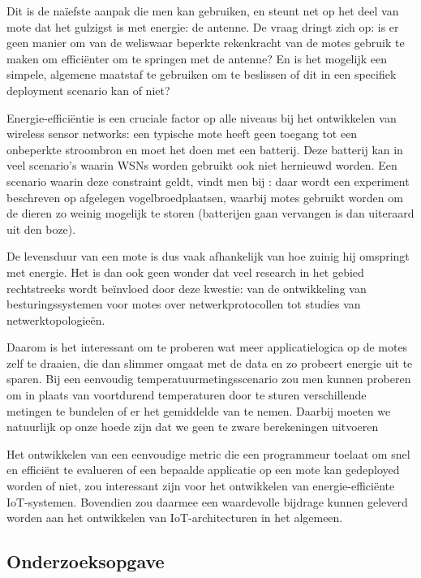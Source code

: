 \documentclass[11pt]{article}
\begin{document}
Dit is de na\"iefste aanpak die men kan gebruiken, en steunt net op het deel van
mote dat het gulzigst is met energie: de antenne.  De vraag dringt zich op: is
er geen manier om van de weliswaar beperkte rekenkracht van de motes gebruik te
maken om effici\"enter om te springen met de antenne? En is het mogelijk een
simpele, algemene maatstaf te gebruiken om te beslissen of dit in een specifiek
deployment scenario kan of niet?

Energie-effici\"entie is een cruciale factor op alle niveaus bij het ontwikkelen
van wireless sensor networks: een typische mote heeft geen toegang tot een
onbeperkte stroombron en moet het doen met een batterij. Deze batterij kan in
veel scenario's waarin WSNs worden gebruikt ook niet hernieuwd worden. Een
scenario waarin deze constraint geldt, vindt men bij
\cite{mainwaring2002wireless}: daar wordt een experiment beschreven op afgelegen
vogelbroedplaatsen, waarbij motes gebruikt worden om de dieren zo weinig
mogelijk te storen (batterijen gaan vervangen is dan uiteraard uit den boze).

De levensduur van een mote is dus vaak afhankelijk van hoe zuinig hij
omspringt met energie. Het is dan ook geen wonder dat veel research in het
gebied rechtstreeks wordt be\"invloed door deze kwestie: van de ontwikkeling van
besturingssystemen voor motes over netwerkprotocollen tot studies van
netwerktopologie\"en.

Daarom is het interessant om te proberen wat meer applicatielogica op de motes
zelf te draaien, die dan slimmer omgaat met de data en zo probeert energie uit
te sparen. Bij een eenvoudig temperatuurmetingsscenario zou men kunnen proberen
om in plaats van voortdurend temperaturen door te sturen verschillende metingen
te bundelen of er het gemiddelde van te nemen. Daarbij moeten we natuurlijk op
onze hoede zijn dat we geen te zware berekeningen uitvoeren

Het ontwikkelen van een eenvoudige metric die een programmeur toelaat om snel en
effici\"ent te evalueren of een bepaalde applicatie op een mote kan gedeployed
worden of niet, zou interessant zijn voor het ontwikkelen van
energie-effici\"ente IoT-systemen. Bovendien zou daarmee een waardevolle
bijdrage kunnen geleverd worden aan het ontwikkelen van IoT-architecturen in
het algemeen.

\subsection{Onderzoeksopgave}
\end{document}
